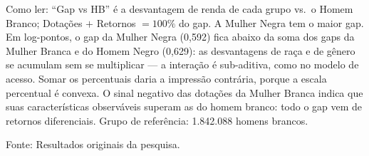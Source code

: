 \documentclass[11pt, a4paper, oneside]{article}
\begin{document}
\begin{table}[!ht]
\centering
\caption{Decomposição interseccional (raça $\times$ gênero) do gap de rendimento
{vs.}\ o Homem Branco (grupo de referência). Dotações: parcela explicada por
características observáveis; Retornos: parcela não explicada (discriminação). Gap (log):
a mesma desvantagem em log-pontos, a escala em que os efeitos de raça e de gênero se somam
\cite{crenshaw1989}. PNAD Contínua, população completa
($N$ do grupo de referência --- homens brancos --- na última linha da nota). Entre
parênteses: erro-padrão por bootstrap em blocos por UPA.}
\label{tab:interseccional}
\par\smallskip
\footnotesize{Como ler:} ``Gap vs HB'' é a desvantagem de renda de cada grupo
{vs.}\ o Homem Branco; Dotações $+$ Retornos $=100\%$ do gap. A Mulher Negra tem o
maior gap. Em log-pontos, o gap da Mulher Negra (0,592) fica abaixo da soma dos gaps da Mulher Branca e do Homem Negro (0,629): as desvantagens de raça e de gênero se acumulam sem se multiplicar --- a interação é sub-aditiva, como no modelo de acesso. Somar os percentuais daria a impressão contrária, porque a escala percentual é convexa. O sinal negativo das dotações da Mulher
Branca indica que suas características observáveis {superam} as do homem branco: todo
o gap vem de retornos diferenciais. Grupo de referência: 1.842.088 homens brancos.
\par\smallskip\footnotesize Fonte: Resultados originais da pesquisa.
\end{table}
\end{document}
